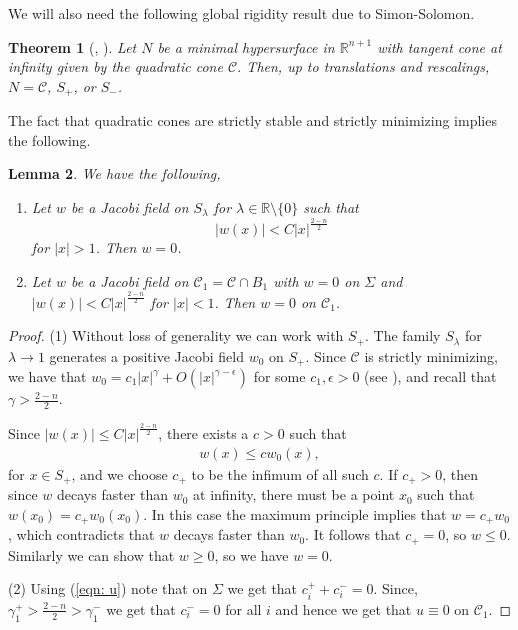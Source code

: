 \documentclass[12pt, reqno ]{amsart}
\newtheorem{theorem}{Theorem}[section]
\newtheorem{lemma}[theorem]{Lemma}
\numberwithin{equation}{section}
\begin{document}
We will also need the following global rigidity result due to Simon-Solomon.
\begin{theorem}[\cite{SimonSolomon}, \cite{Mazet_2017}]\label{Theo: Simon-Solomon}
Let $N$ be a minimal hypersurface in $\mathbb R^{n+1}$ with tangent cone at infinity given by the quadratic cone  $\mathcal{C}$. Then, up to translations and rescalings, $N=\mathcal{C}$, $S_+$, or $S_-$.   
\end{theorem}

The fact that quadratic cones are strictly stable and strictly minimizing implies the following. 
\begin{lemma} \label{prelim:GammaBound}
We have the following, 
\begin{enumerate}
    \item Let $w$ be a Jacobi field on $S_\lambda$ for $\lambda\in \mathbb R\setminus\{0\}$ such that 
$$ |w(x)|<C|x|^{\frac{2-n}{2}}$$
for $|x| > 1$.  Then $w=0$.

\item Let $w$ be a Jacobi field on $\mathcal C_1 = \mathcal{C} \cap B_1$ with $w= 0$ on $\Sigma$ and $|w(x)|<C|x|^{\frac{2-n}{2}}$ for $|x| < 1$. Then $w=0$  on $\mathcal C_1$.
\end{enumerate}

\end{lemma}
\begin{proof}
(1) Without loss of generality we can work with $S_+$. The family $S_\lambda$ for $\lambda \to 1$ generates a positive Jacobi field $w_0$ on $S_+$. Since $\mathcal{C}$ is strictly minimizing, we have that $w_0 = c_1|x|^\gamma + O(|x|^{\gamma - \epsilon})$ for some $c_1, \epsilon > 0$ (see \cite[Theorem 3.2]{SimonHardt}), and recall that $\gamma > \frac{2-n}{2}$. 

Since $|w(x)|\leq C|x|^{\frac{2-n}{2}}$, there exists a $c > 0$  such that 
\begin{eqnarray*}
     w(x)\leq c w_0(x),
\end{eqnarray*}
for $x\in S_+$, and we choose $c_+$ to be the infimum of all such $c$. If $c_+ > 0$, then since $w$ decays faster than $w_0$ at infinity, there must be a point $x_0$ such that $w(x_0) = c_+ w_0(x_0)$. In this case the maximum principle implies that $w=c_+ w_0$, which contradicts that $w$ decays faster than $w_0$. It follows that $c_+ =0$, so $w \leq 0$. Similarly we can show that $w\geq 0$, so we have $w=0$. 

(2) Using (\ref{eqn: u}) note that on $\Sigma$ we get that $c_i^++c_i^-=0$. Since, $\gamma_1^+> \frac{2-n}{2}> \gamma_1^-$ we get that $c_i^-=0$ for all $i$ and hence we get that $u\equiv 0$ on $\mathcal C_1$.
\end{proof}
\end{document}
